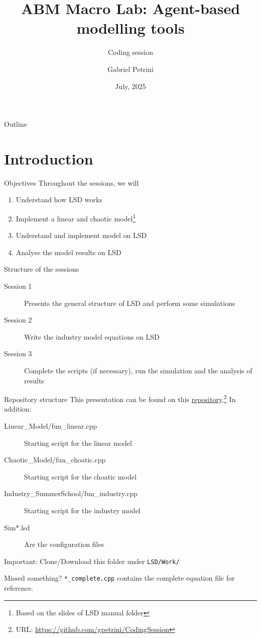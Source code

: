 \documentclass[bigger,aspectratio=169]{beamer}
\author{Gabriel Petrini}
\date{July, 2025}
\title{ABM Macro Lab: Agent-based modelling tools}
\subtitle{Coding session}
\begin{document}
\maketitle
\begin{frame}{Outline}
\tableofcontents
\end{frame}

\section{Introduction}
\label{sec:org1456455}

\begin{frame}[label={sec:org639478b}]{Objectives}
Throughout the sessions, we will

\begin{enumerate}
\item Understand how LSD works
\item Implement a linear and chaotic model\footnote{Based on the slides of LSD manual folder}
\item Understand and implement \textcite{dosi_2017_footprint} model on LSD
\item Analyse the model results on LSD
\end{enumerate}
\end{frame}
\begin{frame}[label={sec:org080b47f}]{Structure of the sessions}
\begin{description}
\item[{Session 1}] Presents the general structure of LSD and perform some simulations
\item[{Session 2}] Write the industry model equations on LSD
\item[{Session 3}] Complete the scripts (if necessary), run the simulation and the analysis of results
\end{description}
\end{frame}
\begin{frame}[label={sec:orga3853ef},fragile]{Repository structure}
 This presentation can be found on this \href{https://github.com/gpetrini/CodingSession}{repository}.\footnote{URL: \url{https://github.com/gpetrini/CodingSession}} In addition:

\begin{description}
\item[{Linear\_Model/fun\_linear.cpp}] Starting script for the linear model
\item[{Chaotic\_Model/fun\_choatic.cpp}] Starting script for the choatic model
\item[{Industry\_SummerSchool/fun\_industry.cpp}] Starting script for the industry model
\item[{Sim*.lsd}] Are the configuration files
\end{description}

\alert{Important:} Clone/Download this folder under \texttt{LSD/Work/}
\begin{block}{Missed something?}
\texttt{*\_complete.cpp} contains the complete equation file for reference.
\end{block}
\end{frame}
\end{document}
